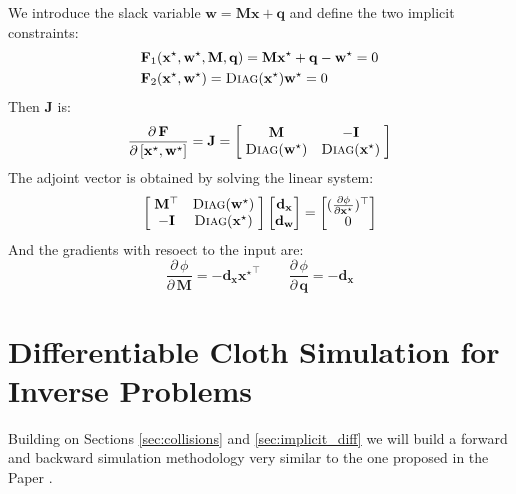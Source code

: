 \documentclass{article}
\newcommand{\pd}[2]{\dfrac{\partial\, #1}{\partial\, #2}}
\newcommand{\pdc}[2]{\frac{\partial #1}{\partial #2}}
\begin{document}
\noindent We introduce the slack variable $\mathbf{w} = \mathbf{M}\mathbf{x} + \mathbf{q}$ and define the two implicit constraints:
\begin{align*}
    &\mathbf{F}_1(\mathbf{x}^\star, \mathbf{w}^\star, \mathbf{M}, \mathbf{q}) = \mathbf{M}\mathbf{x}^\star + \mathbf{q} - \mathbf{w}^\star = 0\\
    &\mathbf{F}_2(\mathbf{x}^\star, \mathbf{w}^\star) = \textsc{Diag}(\mathbf{x}^\star)\mathbf{w}^\star =0 
\end{align*}
Then $\mathbf{J}$ is:
\begin{equation}
\pd{\mathbf{F}}{[\mathbf{x}^\star, \mathbf{w}^\star]} = \mathbf{J} = 
\begin{bmatrix}
    \;\mathbf{M} & -\mathbf{I}\; \\
    \;\textsc{Diag}(\mathbf{w}^\star) & \textsc{Diag}(\mathbf{x}^\star)\;
\end{bmatrix}
\end{equation}
The adjoint vector is obtained by solving the linear system:
\begin{equation}
\begin{bmatrix}
    \;\mathbf{M}^\top & \textsc{Diag}(\mathbf{w}^\star)\; \\
    \;-\mathbf{I} & \textsc{Diag}(\mathbf{x}^\star)\;
\end{bmatrix}
\begin{bmatrix}
    \mathbf{d}_\mathbf{x} \\
    \mathbf{d}_\mathbf{w}
\end{bmatrix} = 
\begin{bmatrix}
    (\pdc{\phi}{\mathbf{x}^\star})^\top \\
    0
\end{bmatrix}
\end{equation}
And the gradients with resoect to the input are:
\begin{equation}
    \pd{\phi}{\mathbf{M}} = -\mathbf{d}_\mathbf{x} {\mathbf{x}^\star}^\top
    \qquad
    \pd{\phi}{\mathbf{q}} = -\mathbf{d}_\mathbf{x}
\end{equation}

\newpage

\section{Differentiable Cloth Simulation for Inverse Problems \cite{liang2019differentiable}}
\label{sec:DiffCloth}

Building on Sections \ref{sec:collisions} and \ref{sec:implicit_diff} we will build a forward and backward simulation methodology very similar to the one proposed in the Paper \cite{liang2019differentiable}. 
\end{document}
